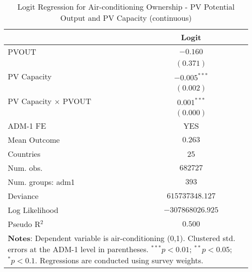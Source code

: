 
\begin{table}[H]
\caption{Logit Regression for Air-conditioning Ownership - PV Potential Output and PV Capacity (continuous)}
\begin{center}
\begin{tabular}{l c}
\hline
 & Logit \\
\hline
PVOUT                      & $-0.160$         \\
                           & $(0.371)$        \\
PV Capacity                & $-0.005^{***}$   \\
                           & $(0.002)$        \\
PV Capacity $\times$ PVOUT & $0.001^{***}$    \\
                           & $(0.000)$        \\
\hline
ADM-1 FE                   & YES              \\
Mean Outcome               & $0.263$          \\
Countries                  & 25               \\
Num. obs.                  & $682727$         \\
Num. groups: adm1          & $393$            \\
Deviance                   & $615737348.127$  \\
Log Likelihood             & $-307868026.925$ \\
Pseudo R$^2$               & $0.500$          \\
\hline
\multicolumn{2}{l}{\scriptsize{\textbf{Notes}: Dependent variable is air-conditioning (0,1). Clustered std. errors at the ADM-1 level in parentheses. $^{***}p<0.01$; $^{**}p<0.05$; $^{*}p<0.1$. Regressions are conducted using survey weights.}}
\end{tabular}
\label{main: tableA9}
\end{center}
\end{table}
